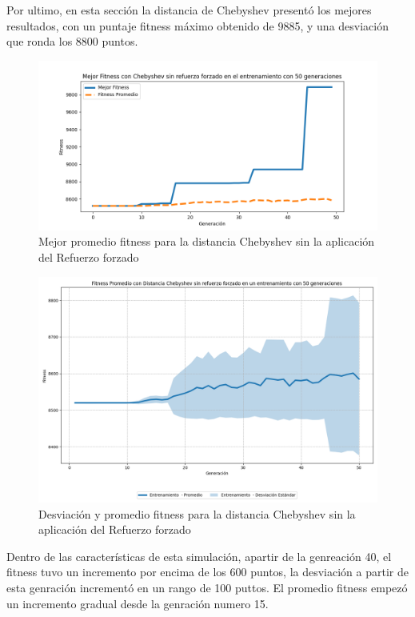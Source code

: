 \documentclass[conference]{IEEEtran}
\begin{document}
Por ultimo, en esta sección la distancia de Chebyshev presentó los mejores resultados, con un puntaje fitness máximo obtenido de 9885, y una desviación que ronda los 8800 puntos.
\begin{figure}[H]
    \centering
    \includegraphics[width=1\linewidth]{Sin_Refuerzo_50Gen/Cheby_NoRef_50Gen.png}
    \caption{Mejor promedio fitness para la distancia Chebyshev sin la aplicación del Refuerzo forzado}
    \label{fig:no_refoice_chy}
\end{figure}
\begin{figure}[H]
    \centering
    \includegraphics[width=0.9\linewidth]{Sin_Refuerzo_50Gen/Cheby_NoRef_50Gen_Sombra.png}
    \caption{Desviación y promedio fitness para la distancia Chebyshev sin la aplicación del Refuerzo forzado}
    \label{fig:no_refoice_chy_desv}
\end{figure}
Dentro de las características de esta simulación, apartir de la genreación 40, el fitness tuvo un incremento por encima de los 600 puntos, la desviación a partir de esta genración incrementó en un rango de 100 puttos. El promedio fitness empezó un incremento gradual desde la genración numero 15. 
\end{document}

